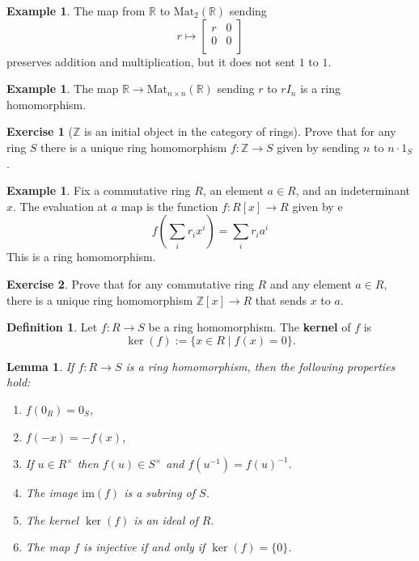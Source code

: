 \documentclass[12pt]{report}
\newtheorem{lemma}[theorem]{Lemma}
\numberwithin{equation}{section}
\numberwithin{theorem}{chapter}
\theoremstyle{definition}
\newtheorem{definition}[theorem]{Definition}
\newtheorem{example}[theorem]{Example}
\newtheorem{exercise}{Exercise}
\newtheorem*{basic properties}{Basic Properties}
\newtheorem*{Important Remark}{Important Remark}
\newcommand{\df}[1]{{\bf #1}\index{#1}}
\renewcommand{\ker}{\operatorname{ker}}
\begin{document}
\begin{example} 
The map from $\mathbb{R}$ to $\mathrm{Mat}_{2}(\mathbb{R})$ sending 
$$r \mapsto \begin{bmatrix} r & 0 \\0  & 0 \\ \end{bmatrix}$$
preserves addition and multiplication, but it does not sent $1$ to $1$.  	
\end{example}


  
\begin{example} 
The map $\mathbb{R}  \to \mathrm{Mat}_{n \times n}(\mathbb{R})$ sending $r$ to $rI_n$ is a ring homomorphism. 	
\end{example}





\begin{exercise}[$\mathbb{Z}$ is an initial object in the category of rings] 
 Prove that for any ring $S$ there is a unique ring homomorphism $f: \mathbb{Z} \to S$ given by sending $n$ to $n \cdot 1_S$. 	
\end{exercise}
  
  
\begin{example} 
Fix a commutative ring $R$, an element $a \in R$, and an indeterminant $x$. The evaluation at $a$ map is the function $f\!: R[x] \to R$ given by e
    $$f \left( \sum_i r_i x^i \right) = \sum_i r_i a^i$$ 
    This is a ring homomorphism.
\end{example}
  

\begin{exercise} 
Prove that for any commutative ring $R$ and any element $a \in R$, there is a unique ring homomorphism $\mathbb{Z}[x] \to R$ that sends $x$ to $a$.   	
\end{exercise}


\begin{definition}
	Let $f\!: R \longrightarrow S$ be a ring homomorphism. The \df{kernel} of $f$ is
	$$\ker(f) := \{ x \in R \mid f(x) = 0 \}.$$
\end{definition}


\begin{lemma}\label{ring hom properties}
If $f\!: R \to S$ is a ring homomorphism, then the following properties hold:
\begin{enumerate}[itemsep=0.1em]
\item $f(0_R) = 0_S$,
\item $f(-x)=-f(x)$, 
\item If $u\in R^\times$ then $f(u) \in S^\times$ and $f(u^{-1})=f(u)^{-1}$.
\item The image $\mathrm{im}(f)$ is a subring of $S$.
\item The kernel $\ker(f)$ is an ideal of $R$.
\item The map $f$ is injective if and only if $\ker(f) = \{0\}$. 
\end{enumerate}
\end{lemma}
\end{document}
